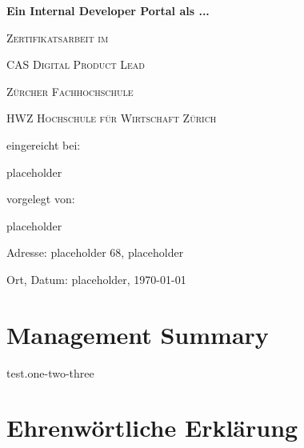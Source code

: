 \documentclass[a4paper,12pt]{article}
\begin{document}
    \begin{titlepage}
        \begin{center}
        {\huge\bfseries Ein Internal Developer Portal als ...\par}
            \vspace{2cm}

            {\scshape\large Zertifikatsarbeit im \par}
            {\scshape\large CAS Digital Product Lead \par}
            \vspace{1cm}

            {\scshape\large Zürcher Fachhochschule \par}
            {\scshape\large HWZ Hochschule für Wirtschaft Zürich \par}
            \vspace{4cm}

            {\normalsize eingereicht bei:\par}
            \vspace{0.5cm}

            {\large placeholder\par}
            \vfill
            {\normalsize vorgelegt von:\par}
            \vspace{0.5cm}
            {\large placeholder\par}
            \vspace{0.5cm}
            {\normalsize Adresse: placeholder 68, placeholder\par}
            {\normalsize  Ort, Datum: placeholder, \today\par}

        \end{center}
    \end{titlepage}


    \section{Management Summary}

    test.one-two-three
    \cite{backstageio}
    \pagebreak


    \tableofcontents
    \pagebreak


    \section{Ehrenwörtliche Erklärung}
\end{document}
